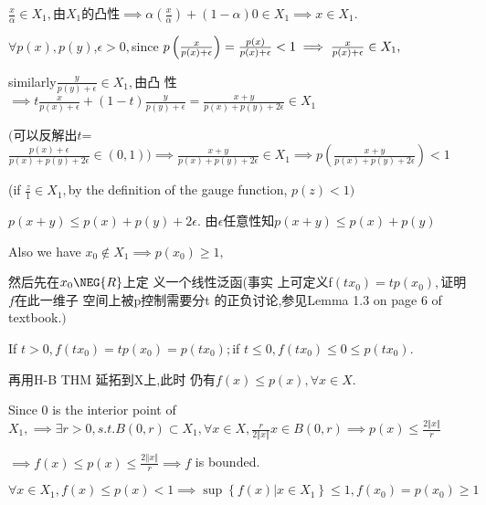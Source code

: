 \documentclass{article}
\begin{document}
\begin{CJK}{GBK}{song}
$\frac{x}{\alpha }\in X_{1},$由$X_{1}$的凸性$%
\implies \alpha \left( \frac{x}{\alpha }\right) +\left( 1-\alpha \right)
0\in X_{1}\implies x\in X_{1}.$

$\forall p\left( x\right) ,p\left( y\right) $,$\epsilon >0,$since $p\left( 
\frac{x}{p\left( x\right) +\epsilon }\right) =\frac{p\left( x\right) }{%
p\left( x\right) +\epsilon }<1\implies \frac{x}{p\left( x\right) +\epsilon }%
\in X_{1},$

similarly$\frac{y}{p\left( y\right) +\epsilon }\in X_{1},$由凸%
性$\implies t\frac{x}{p\left( x\right) +\epsilon }+\left( 1-t\right) 
\frac{y}{p\left( y\right) +\epsilon }=\frac{x+y}{p\left( x\right) +p\left(
y\right) +2\epsilon }\in X_{1}$

$($可以反解出$t$=$\frac{p\left( x\right)
+\epsilon }{p\left( x\right) +p\left( y\right) +2\epsilon }\in \left(
0,1\right) )\implies \frac{x+y}{p\left( x\right) +p\left( y\right)
+2\epsilon }\in X_{1}\implies p\left( \frac{x+y}{p\left( x\right) +p\left(
y\right) +2\epsilon }\right) <1$

(if $\frac{z}{1}\in X_{1},$by the definition of the gauge function, $p\left(
z\right) <1)$

$p\left( x+y\right) \leq p\left( x\right) +p\left( y\right) +2\epsilon .$%
由$\epsilon $任意性知$p\left( x+y\right) \leq
p\left( x\right) +p\left( y\right) $

Also we have $x_{0}\notin X_{1}\implies p\left( x_{0}\right) \geq 1,$

\bigskip 然后先在$x_{0}\NEG{R}$上定%
义一个线性泛函(事实%
上可定义f$\left( tx_{0}\right) =tp\left(
x_{0}\right) ,$证明$f$在此一维子%
空间上被p控制需要分t%
的正负讨论,参见Lemma 1.3 on page 6
of textbook.$)$

If $t>0,f\left( tx_{0}\right) =tp\left( x_{0}\right) =p\left( tx_{0}\right)
; $if $t\leq 0,f\left( tx_{0}\right) \leq 0\leq p\left( tx_{0}\right) .$

再用H-B THM 延拓到X上,此时%
仍有$f(x)\leq p\left( x\right) ,\forall x\in X$.

Since $0$ is the interior point of $X_{1},\implies \exists r>0,s.t.B\left(
0,r\right) \subset X_{1},\forall x\in X,\frac{r}{2\left\Vert x\right\Vert }%
x\in B\left( 0,r\right) \implies p\left( x\right) \leq \frac{2\left\Vert
x\right\Vert }{r}$

$\implies f\left( x\right) \leq p\left( x\right) \leq \frac{2\left\Vert
x\right\Vert }{r}\implies f$ is bounded.

\bigskip $\forall x\in X_{1},f\left( x\right) \leq p\left( x\right)
<1\implies \sup \left\{ f\left( x\right) |x\in X_{1}\right\} \leq 1,f\left(
x_{0}\right) =p\left( x_{0}\right) \geq 1$


\end{CJK}
\end{document}
